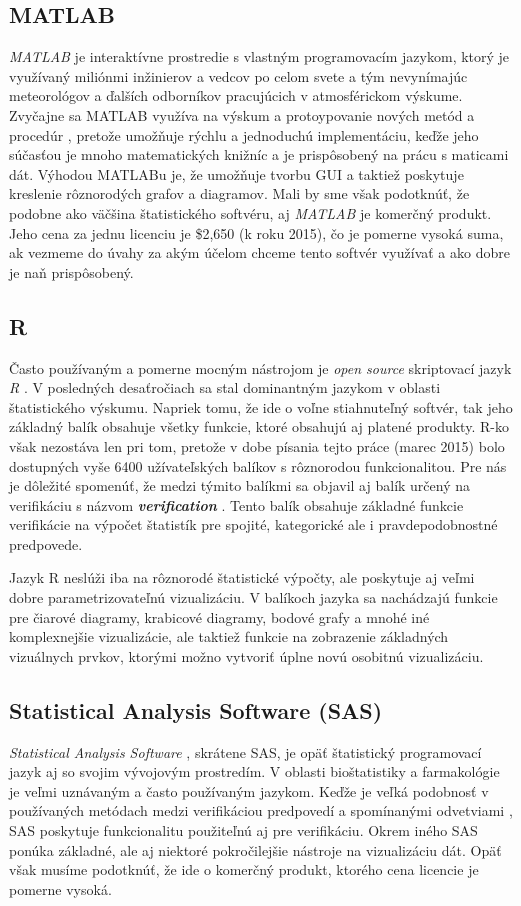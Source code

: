 \subsection{MATLAB}
\textit{MATLAB} je interaktívne prostredie s vlastným programovacím jazykom, ktorý je využívaný miliónmi inžinierov a vedcov po celom svete \cite{Matlab} a tým nevynímajúc meteorológov a ďalších odborníkov pracujúcich v atmosférickom výskume. 
Zvyčajne sa MATLAB využíva na výskum a protoypovanie nových metód a procedúr \cite{VerifSoft}, pretože umožňuje rýchlu a jednoduchú implementáciu, keďže jeho súčasťou je mnoho matematických knižníc a je prispôsobený na prácu s maticami dát.
Výhodou MATLABu je, že umožňuje tvorbu GUI a taktiež poskytuje kreslenie rôznorodých grafov a diagramov.
Mali by sme však podotknúť, že podobne ako väčšina štatistického softvéru, aj \textit{MATLAB} je komerčný produkt. Jeho cena za jednu licenciu je \$2,650 (k roku 2015), čo je pomerne vysoká suma, ak vezmeme do úvahy za akým účelom chceme tento softvér využívať a ako dobre je naň prispôsobený.

\subsection{R}
Často používaným a pomerne mocným nástrojom je \textit{open source} skriptovací jazyk \textit{R} \cite{RProject}. V posledných desaťročiach sa stal dominantným jazykom v oblasti štatistického výskumu. Napriek tomu, že ide o voľne stiahnuteľný softvér, tak jeho základný balík obsahuje všetky funkcie, ktoré obsahujú aj platené produkty. R-ko však nezostáva len pri tom, pretože v dobe písania tejto práce (marec 2015) bolo dostupných vyše 6400 užívateľských balíkov s rôznorodou funkcionalitou. Pre nás je dôležité spomenúť, že medzi týmito balíkmi sa objavil aj balík určený na verifikáciu s názvom \textit{\textbf{verification}} \cite{VerifPackage}. Tento balík obsahuje základné funkcie verifikácie na výpočet štatistík pre spojité, kategorické ale i pravdepodobnostné predpovede. 

Jazyk R neslúži iba na rôznorodé štatistické výpočty, ale poskytuje aj veľmi dobre parametrizovateľnú vizualizáciu. V balíkoch jazyka sa nachádzajú funkcie pre čiarové diagramy, krabicové diagramy, bodové grafy a mnohé iné komplexnejšie vizualizácie, ale taktiež funkcie na zobrazenie základných vizuálnych prvkov, ktorými možno vytvoriť úplne novú osobitnú vizualizáciu.

\subsection[SAS]{Statistical Analysis Software (SAS)}
\textit{Statistical Analysis Software} \cite{SAS}, skrátene SAS, je opäť štatistický programovací jazyk aj so svojim vývojovým prostredím. V oblasti bioštatistiky a farmakológie je veľmi uznávaným a často používaným jazykom. Keďže je veľká podobnosť v používaných metódach medzi verifikáciou predpovedí a spomínanými odvetviami \cite{VerifSoft}, SAS poskytuje funkcionalitu použiteľnú aj pre verifikáciu. Okrem iného SAS ponúka základné, ale aj niektoré pokročilejšie nástroje na vizualizáciu dát. Opäť však musíme podotknúť, že ide o komerčný produkt, ktorého cena licencie je pomerne vysoká.

